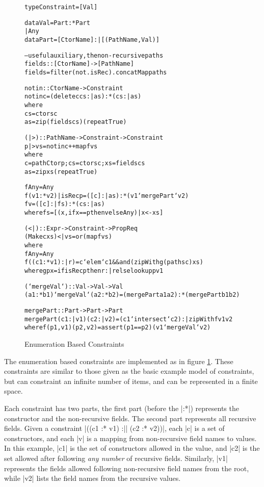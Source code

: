\documentclass[preprint]{sigplanconf}
\newenvironment{code}{\begin{alltt}\small}{\end{alltt}}
\begin{document}
\begin{figure}
\begin{code}
type Constraint = [Val]

data Val   =  Part :* Part
           |  Any
data Part  =  [CtorName] :| [(PathName,Val)]

-- useful auxiliary, the non-recursive paths
fields :: [CtorName] -> [PathName]
fields = filter (not . isRec) . concatMap paths

notin :: CtorName -> Constraint
notin c = (delete c cs :| as) :* (cs :| as)
    where
    cs = ctors c
    as = zip (fields cs) (repeat True)

(|>) :: PathName -> Constraint -> Constraint
p |> vs = notin c ++ map f vs
    where
    c = pathCtor p; cs = ctors c; xs = fields cs
    as = zip xs (repeat True)

    f Any = Any
    f (v1 :* v2) | isRec p = ([c] :| as) :* (v1 `mergePart` v2)
    f v = ([c] :| fs) :* (cs :| as)
        where fs = [(x, if x == p then v else Any) |  x <- xs]

(<|) :: Expr -> Constraint -> Prop Req
(Make c xs) <| vs = or (map f vs)
    where
    f Any = Any
    f ((c1 :* v1) :| r) = c `elem` c1 && and (zipWith g (paths c) xs)
        where g p x = if isRec p then r :| r else lookup p v1

(`mergeVal`) :: Val -> Val -> Val
(a1 :* b1) `mergeVal` (a2 :* b2) = (mergePart a1 a2) :* (mergePart b1 b2)

mergePart :: Part -> Part -> Part
mergePart (c1 :| v1) (c2 :| v2) = (c1 `intersect` c2) :| zipWith f v1 v2
    where f (p1,v1) (p2,v2) = assert (p1 == p2) (v1 `mergeVal` v2)
\end{code}
\caption{Enumeration Based Constraints}
\label{fig:enumeration}
\end{figure}

The enumeration based constraints are implemented as in figure \ref{fig:enumeration}. These constraints are similar to those given as the basic example model of constraints, but can constraint an infinite number of items, and can be represented in a finite space.

Each constraint has two parts, the first part (before the |:*|) represents the constructor and the non-recursive fields. The second part represents all recursive fields. Given a constraint |((c1 :* v1) :|| (c2 :* v2))|, each |c| is a set of constructors, and each |v| is a mapping from non-recursive field names to values. In this example, |c1| is the set of constructors allowed in the value, and |c2| is the set allowed after following \textit{any number} of recursive fields. Similarly, |v1| represents the fields allowed following non-recursive field names from the root, while |v2| lists the field names from the recursive values.
\end{document}
